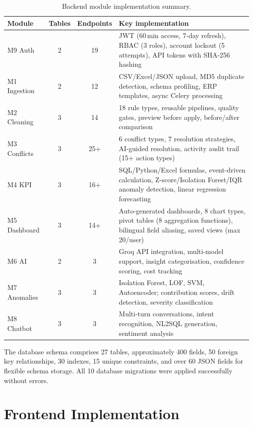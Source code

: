 \begin{table}[h!]
\centering
\caption{Backend module implementation summary.}
\label{tab:backend}
\small
\renewcommand{\arraystretch}{1.3}
\begin{tabular}{|l|c|c|p{4.5cm}|}
\hline
\textbf{Module} & \textbf{Tables} & \textbf{Endpoints} & \textbf{Key implementation} \\
\hline
M9 Auth      & 2 & 19 & JWT (60\,min access, 7-day refresh), RBAC (3 roles), account lockout (5 attempts), API tokens with SHA-256 hashing \\
\hline
M1 Ingestion & 2 & 12 & CSV/Excel/JSON upload, MD5 duplicate detection, schema profiling, ERP templates, async Celery processing \\
\hline
M2 Cleaning  & 3 & 14 & 18 rule types, reusable pipelines, quality gates, preview before apply, before/after comparison \\
\hline
M3 Conflicts & 3 & 25+ & 6 conflict types, 7 resolution strategies, AI-guided resolution, activity audit trail (15+ action types) \\
\hline
M4 KPI       & 3 & 16+ & SQL/Python/Excel formulas, event-driven calculation, Z-score/Isolation Forest/IQR anomaly detection, linear regression forecasting \\
\hline
M5 Dashboard & 3 & 14+ & Auto-generated dashboards, 8 chart types, pivot tables (8 aggregation functions), bilingual field aliasing, saved views (max 20/user) \\
\hline
M6 AI        & 2 & 3  & Groq API integration, multi-model support, insight categorisation, confidence scoring, cost tracking \\
\hline
M7 Anomalies & 3 & 3  & Isolation Forest, LOF, SVM, Autoencoder; contribution scores, drift detection, severity classification \\
\hline
M8 Chatbot   & 3 & 3  & Multi-turn conversations, intent recognition, NL2SQL generation, sentiment analysis \\
\hline
\end{tabular}
\end{table}

\noindent
The database schema comprises 27 tables,
approximately 400 fields,
50 foreign key relationships,
30 indexes,
15 unique constraints,
and over 60 JSON fields for flexible schema storage.
All 10 database migrations were applied successfully
without errors.


\section{Frontend Implementation}


